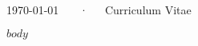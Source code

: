 \documentclass{cool-cv}
\begin{document}
\makecvheader[C]

\makecvfooter
  {\today}
  { \getname ~~~·~~~Curriculum Vitae}
  {\thepage}


$body$
\end{document}
